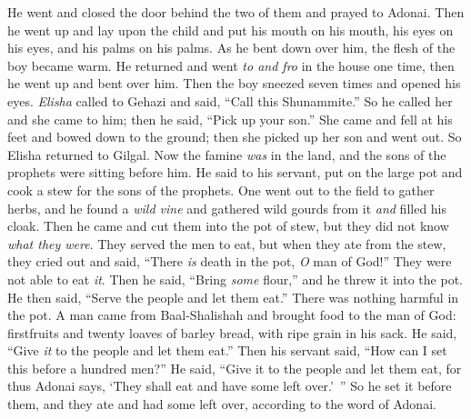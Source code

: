 \begin{biblechapter}
\verse He went and closed the door behind the two of them and prayed to Adonai.
\verse Then he went up and lay upon the child and put his mouth on his mouth, his eyes on his eyes, and his palms on his palms. As he bent down over him, the flesh of the boy became warm.
\verse He returned and went \textit{to and fro} in the house one time, then he went up and bent over him. Then the boy sneezed seven times and opened his eyes.
\verse \textit{Elisha} called to Gehazi and said, “Call this Shunammite.” So he called her and she came to him; then he said, “Pick up your son.”
\verse She came and fell at his feet and bowed down to the ground; then she picked up her son and went out.
 So Elisha returned to Gilgal. Now the famine \textit{was} in the land, and the sons of the prophets were sitting before him. He said to his servant, put on the large pot and cook a stew for the sons of the prophets.
\verse One went out to the field to gather herbs, and he found a \textit{wild vine} and gathered wild gourds from it \textit{and} filled his cloak. Then he came and cut them into the pot of stew, but they did not know \textit{what they were}.
\verse They served the men to eat, but when they ate from the stew, they cried out and said, “There \textit{is} death in the pot, \textit{O} man of God!” They were not able to eat \textit{it}.
\verse Then he said, “Bring \textit{some} flour,” and he threw it into the pot. He then said, “Serve the people and let them eat.” There was nothing harmful in the pot.
\verse A man came from Baal-Shalishah and brought food to the man of God: firstfruits and twenty loaves of barley bread, with ripe grain in his sack. He said, “Give \textit{it} to the people and let them eat.”
\verse Then his servant said, “How can I set this before a hundred men?” He said, “Give it to the people and let them eat, for thus Adonai says, ‘They shall eat and have some left over.’ ”
\verse So he set it before them, and they ate and had some left over, according to the word of Adonai.
\end{biblechapter}

